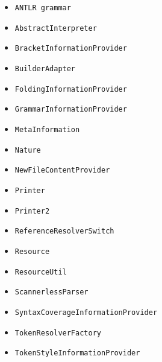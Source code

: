 \begin{itemize}
\item \texttt{ANTLR grammar}
\item \texttt{AbstractInterpreter}
\item \texttt{BracketInformationProvider}
\item \texttt{BuilderAdapter}
\item \texttt{FoldingInformationProvider}
\item \texttt{GrammarInformationProvider}
\item \texttt{MetaInformation}
\item \texttt{Nature}
\item \texttt{NewFileContentProvider}
\item \texttt{Printer}
\item \texttt{Printer2}
\item \texttt{ReferenceResolverSwitch}
\item \texttt{Resource}
\item \texttt{ResourceUtil}
\item \texttt{ScannerlessParser}
\item \texttt{SyntaxCoverageInformationProvider}
\item \texttt{TokenResolverFactory}
\item \texttt{TokenStyleInformationProvider}
\end{itemize}
